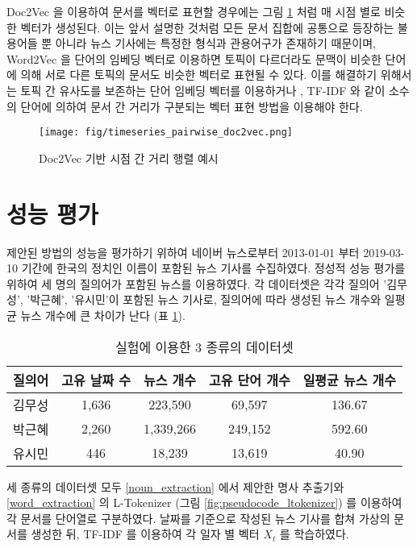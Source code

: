 \documentclass[oneside, ko,phd]{snuthesis_utf8_kor}
\begin{document}
Doc2Vec 을 이용하여 문서를 벡터로 표현할 경우에는 그림 \ref{fig:timeseries_pairwise_doc2vec} 처럼 매 시점 별로 비슷한 벡터가 생성된다.
이는 앞서 설명한 것처럼 모든 문서 집합에 공통으로 등장하는 불용어들 뿐 아니라 뉴스 기사에는 특정한 형식과 관용어구가 존재하기 때문이며, Word2Vec 을 단어의 임베딩 벡터로 이용하면 토픽이 다르더라도 문맥이 비슷한 단어에 의해 서로 다른 토픽의 문서도 비슷한 벡터로 표현될 수 있다.
이를 해결하기 위해서는 토픽 간 유사도를 보존하는 단어 임베딩 벡터를 이용하거나 \cite{moody2016mixing, liu2015topical}, TF-IDF 와 같이 소수의 단어에 의하여 문서 간 거리가 구분되는 벡터 표현 방법을 이용해야 한다.

\begin{figure}[H]
\centering
\texttt{[image: fig/timeseries\_pairwise\_doc2vec.png]}
\caption{Doc2Vec 기반 시점 간 거리 행렬 예시}
\label{fig:timeseries_pairwise_doc2vec}
\end{figure}

\section{성능 평가}

제안된 방법의 성능을 평가하기 위하여 네이버 뉴스로부터 2013-01-01 부터 2019-03-10 기간에 한국의 정치인 이름이 포함된 뉴스 기사를 수집하였다.
정성적 성능 평가를 위하여 세 명의 질의어가 포함된 뉴스를 이용하였다.
각 데이터셋은 각각 질의어 '김무성', '박근혜', '유시민'이 포함된 뉴스 기사로, 질의어에 따라 생성된 뉴스 개수와 일평균 뉴스 개수에 큰 차이가 난다 (표 \ref{tab:timeseries_dataset}).

\begin{table}[H]
\centering
\caption{실험에 이용한 3 종류의 데이터셋}
\label{tab:timeseries_dataset}
\begin{tabular}{|c|c|c|c|c|}
\hline
질의어 & 고유 날짜 수 & 뉴스 개수 & 고유 단어 개수 & 일평균 뉴스 개수 \\ \hline
김무성 & 1,636 & 223,590 & 69,597 & 136.67 \\ \hline
박근혜 & 2,260 & 1,339,266 & 249,152 & 592.60 \\ \hline
유시민 & 446 & 18,239 & 13,619 & 40.90 \\ \hline
\end{tabular}
\end{table}

세 종류의 데이터셋 모두 \ref{noun_extraction} 에서 제안한 명사 추출기와 \ref{word_extraction} 의 L-Tokenizer (그림 \ref{fig:pseudocode_ltokenizer}) 를 이용하여 각 문서를 단어열로 구분하였다.
날짜를 기준으로 작성된 뉴스 기사를 합쳐 가상의 문서를 생성한 뒤, TF-IDF 를 이용하여 각 일자 별 벡터 $X_t$ 를 학습하였다.
\end{document}
